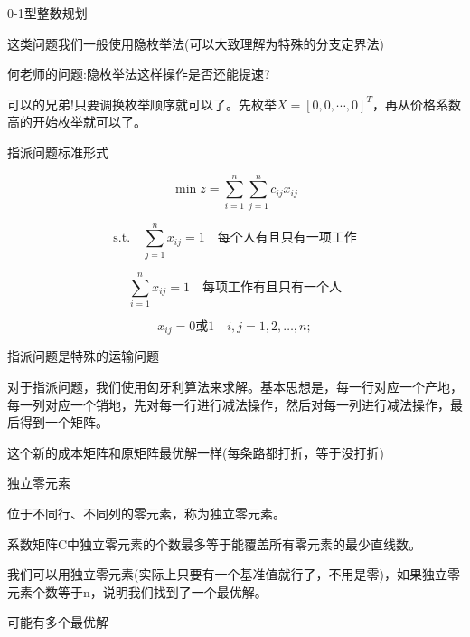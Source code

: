 \documentclass[12pt, a4paper, oneside, UTF8]{ctexbook}
\begin{document}
\begin{remark}
    0-1型整数规划

    这类问题我们一般使用隐枚举法(可以大致理解为特殊的分支定界法)
\end{remark}

何老师的问题:隐枚举法这样操作是否还能提速?

可以的兄弟!只要调换枚举顺序就可以了。先枚举$X=[0,0,\cdots,0]^T$，再从价格系数高的开始枚举就可以了。

\begin{definition}
    指派问题标准形式

$$
\min z = \sum_{i=1}^{n} \sum_{j=1}^{n} c_{ij} x_{ij}
$$

$$
\text{s.t.} \quad \sum_{j=1}^{n} x_{ij} = 1 \quad \text{每个人有且只有一项工作}
$$

$$
\sum_{i=1}^{n} x_{ij} = 1 \quad \text{每项工作有且只有一个人}
$$

$$
x_{ij} = 0 \text{或} 1 \quad i, j = 1, 2, \ldots, n;
$$

指派问题是特殊的运输问题
\end{definition}

对于指派问题，我们使用匈牙利算法来求解。基本思想是，每一行对应一个产地，每一列对应一个销地，先对每一行进行减法操作，然后对每一列进行减法操作，最后得到一个矩阵。

这个新的成本矩阵和原矩阵最优解一样(每条路都打折，等于没打折)

\begin{definition}
    独立零元素

位于不同行、不同列的零元素，称为独立零元素。

系数矩阵C中独立零元素的个数最多等于能覆盖所有零元素的最少直线数。
\end{definition}

我们可以用独立零元素(实际上只要有一个基准值就行了，不用是零)，如果独立零元素个数等于n，说明我们找到了一个最优解。

\begin{remark}
    可能有多个最优解
\end{remark}

\ifx\allfiles\undefined
\end{document}
